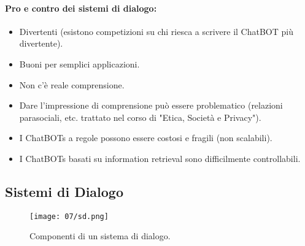 \paragraph{Pro e contro dei sistemi di dialogo:}

\begin{itemize}
  \item[\textcolor{green}{\ding{51}}] Divertenti (esistono competizioni su chi riesca a scrivere il ChatBOT più divertente). 
\item[\textcolor{green}{\ding{51}}] Buoni per semplici applicazioni.
  \item[\textcolor{red}{\ding{55}}] Non c'è reale comprensione. 
     \item[\textcolor{red}{\ding{55}}] Dare l'impressione di comprensione può essere problematico (relazioni parasociali, etc. trattato nel corso di "Etica, Società e Privacy"). 
        \item[\textcolor{red}{\ding{55}}] I ChatBOTs a regole possono essere costosi e fragili (non scalabili). 
           \item[\textcolor{red}{\ding{55}}] I ChatBOTs basati su information retrieval sono difficilmente controllabili.
\end{itemize}

\subsection{Sistemi di Dialogo}

\begin{figure}[h]
    \centering
    \texttt{[image: 07/sd.png]}
    \caption{Componenti di un sistema di dialogo.}
\end{figure}

